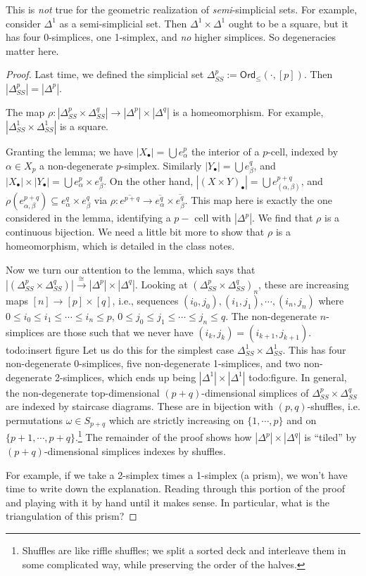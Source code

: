  This is \emph{not} true for the geometric realization of \emph{semi}-simplicial sets. For example, consider $\Delta ^1$ as a semi-simplicial set. Then $\Delta ^1 \times \Delta ^1$ ought to be a square, but it has four 0-simplices, one 1-simplex, and \emph{no} higher simplices.
 So degeneracies matter here.

 \begin{proof}
     Last time, we defined the simplicial set $\Delta ^p_{S S}:= \mathsf{Ord} _{\leq}(\cdot ,[p])$. Then $|\Delta ^p _{S S}|=|\Delta ^p|$.
     \begin{lemma}
         The map $\rho \colon |\Delta _{S S}^p \times \Delta _{S S}^q |\to |\Delta ^p|\times |\Delta ^q| $ is a homeomorphism. For example, $|\Delta ^1_{S S}\times \Delta ^1_{S S}|$ is a square. 
     \end{lemma}
     Granting the lemma; we have $|X_{\bullet}|= \bigcup e_{\alpha }^p$ the interior of a $p$-cell, indexed by $\alpha  \in X_p$ a non-degenerate $p$-simplex. Similarly $|Y_{\bullet}|= \bigcup e_{\beta }^q$, and $|X_{\bullet}| \times |Y_{\bullet}|= \bigcup e_{\alpha }^p \times e_{\beta }^q $. On the other hand, $|(X \times Y)_{\bullet}|= \bigcup e^{p+q}_{(\alpha ,\beta )}$, and $\rho(e^{p+q}_{\alpha ,\beta })\subseteq e_{\alpha }^q \times e_{\beta }^q$ via $\rho \colon \overline{e^{p+q}} \to \overline{e_{\alpha }^q}\times \overline{e_{\beta }^q}$. This map here is exactly the one considered in the lemma, identifying a $p-$ cell with $|\Delta ^p|$. We find that $\rho$ is a continuous bijection. We need a little bit more to show that $\rho$ is a homeomorphism, which is detailed in the class notes.

     Now we turn our attention to the lemma, which says that $|(\Delta _{S S}^p \times \Delta _{S S}^q)| \xrightarrow{\cong}|\Delta ^p|\times  |\Delta ^q|$. Looking at $(\Delta _{S S}^p \times \Delta _{S S}^q)_n $, these are increasing maps $[n] \to [p] \times [q]$, i.e., sequences $(i_0,j_0),(i_1,j_1),\cdots ,(i_n ,j_n )$ where $0\leq i_0 \leq i_1 \leq \cdots \leq i_n  \leq p$, $0 \leq j_0 \leq j_1 \leq \cdots \leq j_n  \leq q$. The non-degenerate $n$-simplices are those such that we never have $(i_k,j_k)=(i_{k+1}, j_{k+1})$.
     {\color{red}todo:insert figure} 
     Let us do this for the simplest case $\Delta _{S S}^1\times \Delta _{S S}^1$. This has four non-degenerate 0-simplices, five non-degenerate 1-simplices, and two non-degenerate 2-simplices, which ends up being $|\Delta ^1| \times |\Delta ^1|$ {\color{red}todo:figure}. In general, the non-degenerate top-dimensional $(p+q)$-dimensional simplices of $\Delta ^p_{S S}\times \Delta ^q _{S S}$ are indexed by staircase diagrams. These are in bijection with $(p,q)$-shuffles, i.e. permutations $\omega \in S_{p+q}$ which are strictly increasing on $\{1,\cdots ,p\} $ and on $\{p+1, \cdots ,p+q\} $.\footnote{Shuffles are like riffle shuffles; we split a sorted deck and interleave them in some complicated way, while preserving the order of the halves.} The remainder of the proof shows how $|\Delta ^p|\times |\Delta ^q|$ is ``tiled'' by $(p+q)$-dimensional simplices indexes by shuffles.

     For example, if we take a 2-simplex times a 1-simplex (a prism), we won't have time to write down the explanation. Reading through this portion of the proof and playing with it by hand until it makes sense. In particular, what is the triangulation of this prism?
 \end{proof}

